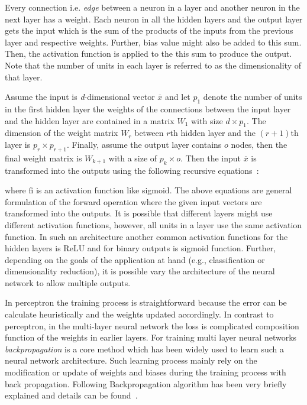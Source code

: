 Every connection i.e. \textit{edge} between a neuron in a layer and another neuron in the next layer has a weight. Each neuron in all the hidden layers and the output layer gets the input which is the sum of the products of the inputs from the previous layer and respective weights. Further, bias value might also be added to this sum. Then, the activation function is applied to the this sum to produce the output. Note that the number of units in each layer is referred to as the dimensionality of that layer.



Assume the input is \textit{d}-dimensional vector $\overline{x}$ and let $p_1$ denote the number of units in the first hidden layer the weights of the connections between the input layer and the hidden layer are contained in a matrix $W_1$ with size $d\times p_1$. The dimension of the weight matrix $W_r$ between $r$th hidden layer and the $(r+1)$th layer is $p_r\times p_{r+1}$. Finally, assume the output layer contains $o$ nodes, then the final weight matrix is $W_{k+1}$ with a size of $p_k\times o$. Then the input $\overline{x}$ is transformed into the outputs using the following recursive equations~\cite{book}:


where fi is an activation function like sigmoid. The above equations are general formulation of the forward operation where the given input vectors are transformed into the outputs. It is possible that different layers might use different activation functions, however,  all units in a layer use the same activation function. In such an architecture another common activation functions for the hidden layers is ReLU and for binary outputs is sigmoid function. 
Further, depending on the  goals of the application at hand (e.g., classification or dimensionality reduction), it is possible vary the architecture of the neural network to allow multiple outputs. 




In perceptron the training process is straightforward because the error can be calculate heuristically and the weights updated accordingly. In contrast to perceptron, in the multi-layer neural network the loss is complicated composition function of the weights in earlier layers. For training multi layer neural networks \textit{backpropagation} is a core method which has been widely used to learn such a neural network architecture.
Such learning process mainly rely on the modification or update of weights and biases during the training process with back propagation. Following Backpropagation algorithm has been very briefly explained and details can be found~\cite{}. 

